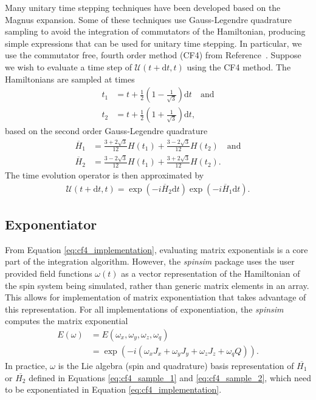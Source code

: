 \documentclass{jors}
\begin{document}
		Many unitary time stepping techniques have been developed based on the Magnus expansion\cite{auer_magnus_2018}.
		Some of these techniques use Gauss-Legendre quadrature sampling to avoid the integration of commutators of the Hamiltonian, producing simple expressions that can be used for unitary time stepping\cite{auer_magnus_2018}. %
		In particular, we use the commutator free, fourth order method (CF4) from Reference~\cite{auer_magnus_2018}.
		Suppose we wish to evaluate a time step of \(\mathcal{U}(t + \mathrm{d}t, t)\) using the CF4 method.
		The Hamiltonians are sampled at times
		\begin{align}
			t_1 &= t + \frac12 \left(1 - \frac{1}{\sqrt{3}}\right)\mathrm{d}t\quad\text{and}\\
			t_2 &= t + \frac12 \left(1 + \frac{1}{\sqrt{3}}\right)\mathrm{d}t,
		\end{align} %
		based on the second order Gauss-Legendre quadrature
		\begin{align}
			\overline{H}_1 &= \frac{3 + 2\sqrt{3}}{12}H(t_1) + \frac{3 - 2\sqrt{3}}{12}H(t_2)\quad\text{and}\label{eq:cf4_sample_1}\\
			\overline{H}_2 &= \frac{3 - 2\sqrt{3}}{12}H(t_1) + \frac{3 + 2\sqrt{3}}{12}H(t_2).\label{eq:cf4_sample_2}
		\end{align}
		The time evolution operator is then approximated by
		\begin{align}
			\mathcal{U}(t + \mathrm{d}t, t) = \exp(-i\overline{H}_2\mathrm{d}t)\exp(-i\overline{H}_1\mathrm{d}t).\label{eq:cf4_implementation}
		\end{align}%

	\subsection{Exponentiator}
		From Equation \eqref{eq:cf4_implementation}, evaluating matrix exponentials is a core part of the integration algorithm.
		However, the \emph{spinsim} package uses the user provided field functions \(\omega(t)\) as a vector representation of the Hamiltonian of the spin system being simulated, rather than generic matrix elements in an array.
		This allows for implementation of matrix exponentiation that takes advantage of this representation.
		For all implementations of exponentiation, the \emph{spinsim} computes the matrix exponential
		\begin{align}
			E(\omega) &= E(\omega_x, \omega_y, \omega_z, \omega_q)\\
			&= \exp(-i (\omega_x J_x + \omega_y J_y + \omega_z J_z + \omega_q Q)).
		\end{align}
		In practice, \(\omega\) is the Lie algebra (spin and quadrature) basis representation of \(\overline{H_1}\) or \(\overline{H_2}\) defined in Equations \eqref{eq:cf4_sample_1} and \eqref{eq:cf4_sample_2}, which need to be exponentiated in Equation \eqref{eq:cf4_implementation}.
\end{document}
